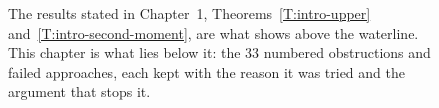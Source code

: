 \begin{figure}[htbp]
  \centering
  
  \caption[What lies below the waterline]{The results stated in Chapter~1,
    Theorems~\ref{T:intro-upper} and~\ref{T:intro-second-moment}, are what shows
    above the waterline. This chapter is what lies below it: the 33 numbered
    obstructions and failed approaches, each kept with the reason it was tried and
    the argument that stops it.}
  \label{Fig:nogo-iceberg}
\end{figure}
